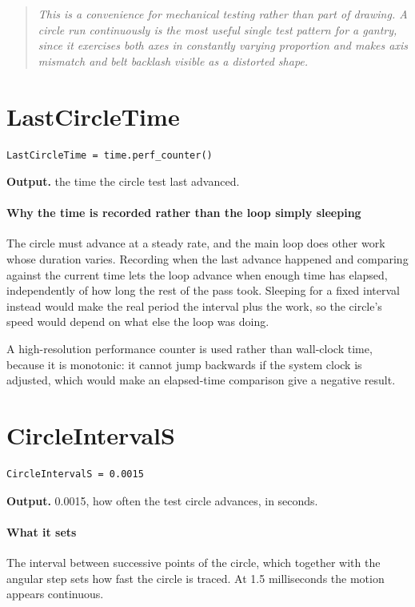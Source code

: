 \begin{quote}\small\itshape This is a convenience for mechanical testing rather than part of drawing. A circle run continuously is the most useful single test pattern for a gantry, since it exercises both axes in constantly varying proportion and makes axis mismatch and belt backlash visible as a distorted shape.\end{quote}

\section{LastCircleTime}
\begin{lstlisting}[style=sig]
LastCircleTime = time.perf_counter()
\end{lstlisting}

\noindent\textbf{Output.} the time the circle test last advanced.


\paragraph{Why the time is recorded rather than the loop simply sleeping}
The circle must advance at a steady rate, and the main loop does other work whose duration varies. Recording when the last advance happened and comparing against the current time lets the loop advance when enough time has elapsed, independently of how long the rest of the pass took. Sleeping for a fixed interval instead would make the real period the interval plus the work, so the circle's speed would depend on what else the loop was doing.

A high-resolution performance counter is used rather than wall-clock time, because it is monotonic: it cannot jump backwards if the system clock is adjusted, which would make an elapsed-time comparison give a negative result.


\section{CircleIntervalS}
\begin{lstlisting}[style=sig]
CircleIntervalS = 0.0015
\end{lstlisting}

\noindent\textbf{Output.} 0.0015, how often the test circle advances, in seconds.


\paragraph{What it sets}
The interval between successive points of the circle, which together with the angular step sets how fast the circle is traced. At 1.5 milliseconds the motion appears continuous.


